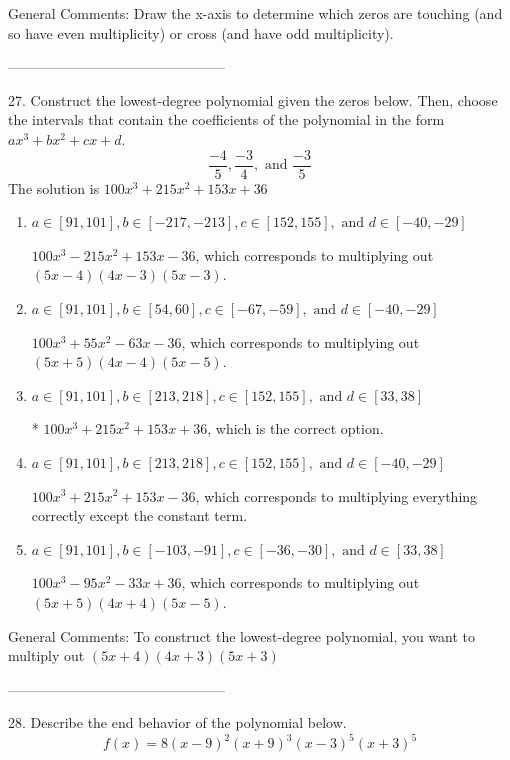 \documentclass{extbook}[14pt]
\begin{document}
General Comments: Draw the x-axis to determine which zeros are touching (and so have even multiplicity) or cross (and have odd multiplicity).

-----------------------------------------------

27. Construct the lowest-degree polynomial given the zeros below. Then, choose the intervals that contain the coefficients of the polynomial in the form $ax^3+bx^2+cx+d$.
\[ \frac{-4}{5}, \frac{-3}{4}, \text{ and } \frac{-3}{5} \] 
The solution is $ 100x^{3} +215 x^{2} +153 x + 36 $ 

\begin{enumerate}[label=\Alph*.] 
\item $ a \in [91, 101], b \in [-217, -213], c \in [152, 155], \text{ and } d \in [-40, -29] $ 

 $100x^{3} -215 x^{2} +153 x -36$, which corresponds to multiplying out $(5x -4)(4x -3)(5x -3)$. 
\item $ a \in [91, 101], b \in [54, 60], c \in [-67, -59], \text{ and } d \in [-40, -29] $ 

 $100x^{3} +55 x^{2} -63 x -36$, which corresponds to multiplying out $(5x + 5)(4x -4)(5x -5)$. 
\item $ a \in [91, 101], b \in [213, 218], c \in [152, 155], \text{ and } d \in [33, 38] $ 

 * $100x^{3} +215 x^{2} +153 x + 36$, which is the correct option. 
\item $ a \in [91, 101], b \in [213, 218], c \in [152, 155], \text{ and } d \in [-40, -29] $ 

 $100x^{3} +215 x^{2} +153 x -36$, which corresponds to multiplying everything correctly except the constant term. 
\item $ a \in [91, 101], b \in [-103, -91], c \in [-36, -30], \text{ and } d \in [33, 38] $ 

 $100x^{3} -95 x^{2} -33 x + 36$, which corresponds to multiplying out $(5x + 5)(4x + 4)(5x -5)$. 
\end{enumerate} 
 
General Comments: To construct the lowest-degree polynomial, you want to multiply out $(5x + 4)(4x + 3)(5x + 3)$

-----------------------------------------------

28. Describe the end behavior of the polynomial below.
\[ f(x) = 8(x - 9)^{2}(x + 9)^{3}(x - 3)^{5}(x + 3)^{5} \] 
\end{document}

